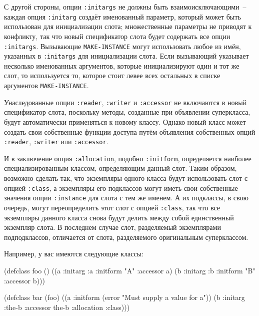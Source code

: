 С другой стороны, опции \lstinline{:initargs} не должны быть взаимоисключающими~-- каждая опция
\lstinline{:initarg} создаёт именованный параметр, который может быть использован для
инициализации слота; множественные параметры не приводят к конфликту, так что новый
спецификатор слота будет содержать все опции \lstinline{:initargs}. Вызывающие
\lstinline{MAKE-INSTANCE} могут использовать любое из имён, указанных в \lstinline{:initargs} для
инициализации слота. Если вызывающий указывает несколько именованных аргументов, которые
инициализируют один и тот же слот, то используется то, которое стоит левее всех остальных
в списке аргументов \lstinline{MAKE-INSTANCE}.

Унаследованные опции \lstinline{:reader}, \lstinline{:writer} и \lstinline{:accessor} не включаются в
новый спецификатор слота, поскольку методы, созданные при объявлении суперкласса, будут
автоматически применяться к новому классу.  Однако новый класс может создать свои
собственные функции доступа путём объявления собственных опций \lstinline{:reader},
\lstinline{:writer} или \lstinline{:accessor}.

И в заключение опция \lstinline{:allocation}, подобно \lstinline{:initform}, определяется наиболее
специализированным классом, определяющим данный слот.  Таким образом, возможно сделать
так, что экземпляры одного класса будут использовать слот с опцией \lstinline{:class}, а
экземпляры его подклассов могут иметь свои собственные значения опции \lstinline{:instance} для
слота с тем же именем.  А их подклассы, в свою очередь, могут переопределить этот слот с
опцией \lstinline{:class}, так что все экземпляры данного класса снова будут делить между собой
единственный экземпляр слота.  В последнем случае слот, разделяемый экземплярами
подподклассов, отличается от слота, разделяемого оригинальным суперклассом.

Например, у вас имеются следующие классы:

\begin{myverb}
(defclass foo ()
  ((a :initarg :a :initform "A" :accessor a)
   (b :initarg :b :initform "B" :accessor b)))

(defclass bar (foo)
  ((a :initform (error "Must supply a value for a"))
   (b :initarg :the-b :accessor the-b :allocation :class)))
\end{myverb}


